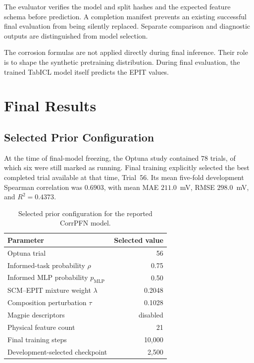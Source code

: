 \documentclass{article}
\begin{document}
The evaluator verifies the model and split hashes and the expected feature
schema before prediction. A completion manifest prevents an existing
successful final evaluation from being silently replaced. Separate comparison
and diagnostic outputs are distinguished from model selection.

The corrosion formulas are not applied directly during final inference.
Their role is to shape the synthetic pretraining distribution. During final
evaluation, the trained TabICL model itself predicts the EPIT values.

\section{Final Results}
\label{sec:results}

\subsection{Selected Prior Configuration}

At the time of final-model freezing, the Optuna study contained \(78\)
trials, of which six were still marked as running. Final training explicitly
selected the best completed trial available at that time, Trial~56. Its mean
five-fold development Spearman correlation was \(0.6903\), with mean MAE
\(211.0\)~mV, RMSE \(298.0\)~mV, and \(R^2=0.4373\).

\begin{table}[htbp]
\centering
\caption{Selected prior configuration for the reported CorrPFN model.}
\label{tab:selected-configuration}
\begin{tabular}{lr}
\toprule
Parameter & Selected value \\
\midrule
Optuna trial & 56 \\
Informed-task probability \(\rho\) & 0.75 \\
Informed MLP probability \(p_{\mathrm{MLP}}\) & 0.50 \\
SCM--EPIT mixture weight \(\lambda\) & 0.2048 \\
Composition perturbation \(\tau\) & 0.1028 \\
Magpie descriptors & disabled \\
Physical feature count & 21 \\
Final training steps & 10,000 \\
Development-selected checkpoint & 2,500 \\
\bottomrule
\end{tabular}
\end{table}
\end{document}
